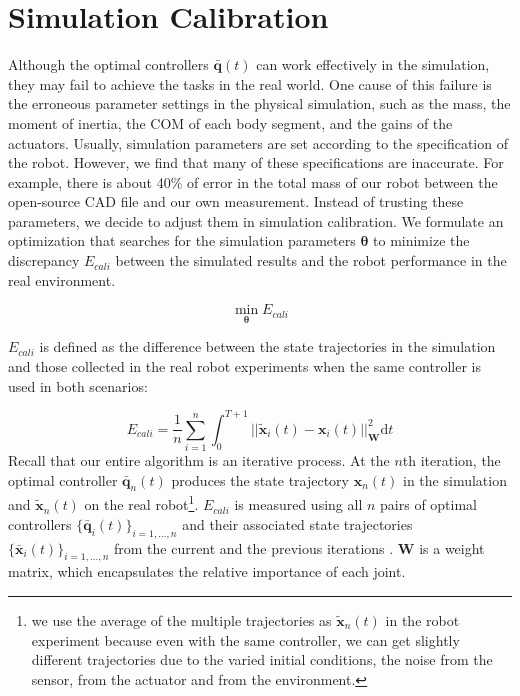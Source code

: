\section{Simulation Calibration}
Although the optimal controllers $\bar{\mathbf{q}}(t)$ can work effectively in the simulation, they may fail to achieve the tasks in the real world. One cause of this failure is the erroneous parameter settings in the physical simulation, such as the mass, the moment of inertia, the COM of each body segment, and the gains of the actuators. Usually, simulation parameters are set according to the specification of the robot. However, we find that many of these specifications are inaccurate. For example, there is about 40\% of error in the total mass of our robot between the open-source CAD file and our own measurement. Instead of trusting these parameters, we decide to adjust them in simulation calibration. We formulate an optimization that searches for the simulation parameters $\mathbf{\theta}$ to minimize the discrepancy $E_{cali}$ between the simulated results and the robot performance in the real environment.

\begin{equation}
 \min_{\mathbf{\theta}} E_{cali}
\label{eqn:calibration}
\end{equation}

$E_{cali}$ is defined as the difference between the state trajectories in the simulation and those collected in the real robot experiments when the same controller is used in both scenarios:

\begin{equation}
  E_{cali}=\frac{1}{n}\sum_{i=1}^{n}\int_{0}^{T+1}||\tilde{\mathbf{x}}_i(t)-\mathbf{x}_i(t)||_{\mathbf{W}}^2\mathrm{d}t
  \label{eqn:calibrationObj}
\end{equation}
Recall that our entire algorithm is an iterative process. At the $n$th iteration, the optimal controller $\bar{\mathbf{q}}_n(t)$ produces the state trajectory $\mathbf{x}_n(t)$ in the simulation and $\tilde{\mathbf{x}}_n(t)$ on the real robot\footnote{we use the average of the multiple trajectories as $\tilde{\mathbf{x}}_n(t)$ in the robot experiment because even with the same controller, we can get slightly different trajectories due to the varied initial conditions, the noise from the sensor, from the actuator and from the environment.}. $E_{cali}$ is measured using all $n$ pairs of optimal controllers $\{\bar{\mathbf{q}}_i(t)\}_{i=1,...,n}$ and their associated state trajectories $\{\bar{\mathbf{x}}_i(t)\}_{i=1,...,n}$ from the current and the previous iterations .  $\mathbf{W}$ is a weight matrix, which encapsulates the relative importance of each joint.

